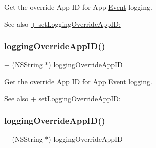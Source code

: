 Get the \textquotesingle{}override\textquotesingle{} App ID for App \hyperlink{classEvent}{Event} logging.

\begin{DoxySeeAlso}{See also}
{\ttfamily \hyperlink{interfaceFBAppEvents_a3f9d06a1e8b3d482efc5c438827fbc6e}{+ set\+Logging\+Override\+App\+I\+D\+:}} 
\end{DoxySeeAlso}
\mbox{\label{interfaceFBAppEvents_a1aa76011dcc7ab662780b05cfcc65f38}} 
\subsubsection{\texorpdfstring{logging\+Override\+App\+I\+D()}{loggingOverrideAppID()}\hspace{0.1cm}{\footnotesize\ttfamily [4/5]}}
{\footnotesize\ttfamily + (N\+S\+String $\ast$) logging\+Override\+App\+ID \begin{DoxyParamCaption}{ }\end{DoxyParamCaption}}

Get the \textquotesingle{}override\textquotesingle{} App ID for App \hyperlink{classEvent}{Event} logging.

\begin{DoxySeeAlso}{See also}
{\ttfamily \hyperlink{interfaceFBAppEvents_a3f9d06a1e8b3d482efc5c438827fbc6e}{+ set\+Logging\+Override\+App\+I\+D\+:}} 
\end{DoxySeeAlso}
\mbox{\label{interfaceFBAppEvents_a1aa76011dcc7ab662780b05cfcc65f38}} 
\subsubsection{\texorpdfstring{logging\+Override\+App\+I\+D()}{loggingOverrideAppID()}\hspace{0.1cm}{\footnotesize\ttfamily [5/5]}}
{\footnotesize\ttfamily + (N\+S\+String $\ast$) logging\+Override\+App\+ID \begin{DoxyParamCaption}{ }\end{DoxyParamCaption}}

